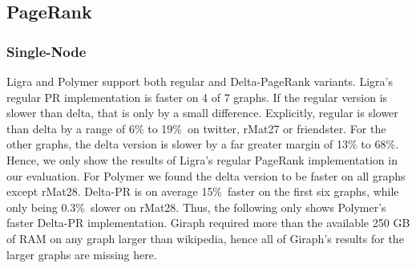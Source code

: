 

\subsection{PageRank}


\subsubsection{Single-Node}
Ligra and Polymer support both regular and Delta-PageRank variants.
Ligra's regular PR implementation is faster on 4 of 7 graphs. If the regular version is slower than delta, that is only by a small difference. Explicitly, regular is slower than delta by a range of 6\% to 19\%\ on twitter, rMat27 or friendster. For the other graphs, the delta version is slower by a far greater margin of 13\% to 68\%.
Hence, we only show the results of Ligra's regular PageRank implementation in our evaluation.
For Polymer we found the delta version to be faster on all graphs except rMat28. Delta-PR is on average 15\%\ faster on the first six graphs, while only being 0.3\%\ slower on rMat28.
Thus, the following only shows Polymer's faster Delta-PR implementation.
Giraph required more than the available 250 GB of RAM on any graph larger than wikipedia, hence all of Giraph's results for the larger graphs are missing here.
